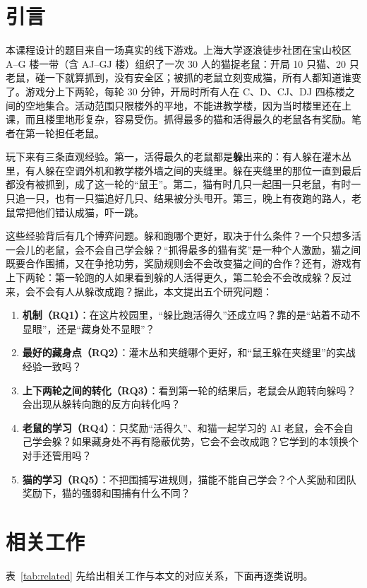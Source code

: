 \section{引言}
本课程设计的题目来自一场真实的线下游戏。上海大学逐浪徒步社团在宝山校区 A–G 楼一带（含 AJ–GJ 楼）组织了一次 30 人的猫捉老鼠：开局 10 只猫、20 只老鼠，碰一下就算抓到，没有安全区；被抓的老鼠立刻变成猫，所有人都知道谁变了。游戏分上下两轮，每轮 30 分钟，开局时所有人在 C、D、CJ、DJ 四栋楼之间的空地集合。活动范围只限楼外的平地，不能进教学楼，因为当时楼里还在上课，而且楼里地形复杂，容易受伤。抓得最多的猫和活得最久的老鼠各有奖励。笔者在第一轮担任老鼠。

玩下来有三条直观经验。第一，活得最久的老鼠都是\textbf{躲}出来的：有人躲在灌木丛里，有人躲在空调外机和教学楼外墙之间的夹缝里。躲在夹缝里的那位一直到最后都没有被抓到，成了这一轮的“鼠王”。第二，猫有时几只一起围一只老鼠，有时一只追一只，也有一只猫追好几只、结果被分头甩开。第三，晚上有夜跑的路人，老鼠常把他们错认成猫，吓一跳。

这些经验背后有几个博弈问题。躲和跑哪个更好，取决于什么条件？一个只想多活一会儿的老鼠，会不会自己学会躲？“抓得最多的猫有奖”是一种个人激励，猫之间既要合作围捕，又在争抢功劳，奖励规则会不会改变猫之间的合作？还有，游戏有上下两轮：第一轮跑的人如果看到躲的人活得更久，第二轮会不会改成躲？反过来，会不会有人从躲改成跑？据此，本文提出五个研究问题：

\begin{enumerate}
  \item \textbf{机制（RQ1）}：在这片校园里，“躲比跑活得久”还成立吗？靠的是“站着不动不显眼”，还是“藏身处不显眼”？
  \item \textbf{最好的藏身点（RQ2）}：灌木丛和夹缝哪个更好，和“鼠王躲在夹缝里”的实战经验一致吗？
  \item \textbf{上下两轮之间的转化（RQ3）}：看到第一轮的结果后，老鼠会从跑转向躲吗？会出现从躲转向跑的反方向转化吗？
  \item \textbf{老鼠的学习（RQ4）}：只奖励“活得久”、和猫一起学习的 AI 老鼠，会不会自己学会躲？如果藏身处不再有隐蔽优势，它会不会改成跑？它学到的本领换个对手还管用吗？
  \item \textbf{猫的学习（RQ5）}：不把围捕写进规则，猫能不能自己学会？个人奖励和团队奖励下，猫的强弱和围捕有什么不同？
\end{enumerate}

\section{相关工作}
表~\ref{tab:related} 先给出相关工作与本文的对应关系，下面再逐类说明。

